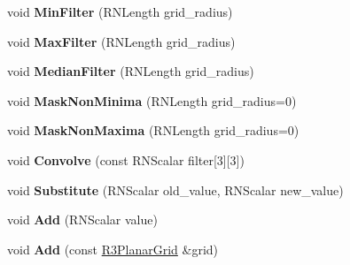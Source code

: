 \begin{DoxyCompactItemize}
\item 
void {\bfseries Min\+Filter} (R\+N\+Length grid\+\_\+radius)\hypertarget{class_r3_planar_grid_ae52410af81de7e0436f52debf78c15fe}{}\label{class_r3_planar_grid_ae52410af81de7e0436f52debf78c15fe}

\item 
void {\bfseries Max\+Filter} (R\+N\+Length grid\+\_\+radius)\hypertarget{class_r3_planar_grid_a4cea66aea6c435cc394eaa30842c377a}{}\label{class_r3_planar_grid_a4cea66aea6c435cc394eaa30842c377a}

\item 
void {\bfseries Median\+Filter} (R\+N\+Length grid\+\_\+radius)\hypertarget{class_r3_planar_grid_a0c0285eaea1580d210466c76c50890b2}{}\label{class_r3_planar_grid_a0c0285eaea1580d210466c76c50890b2}

\item 
void {\bfseries Mask\+Non\+Minima} (R\+N\+Length grid\+\_\+radius=0)\hypertarget{class_r3_planar_grid_a96004430a585c6b4657d3232fa7f50bb}{}\label{class_r3_planar_grid_a96004430a585c6b4657d3232fa7f50bb}

\item 
void {\bfseries Mask\+Non\+Maxima} (R\+N\+Length grid\+\_\+radius=0)\hypertarget{class_r3_planar_grid_a96b37e8de761174a9ed14cf457457b31}{}\label{class_r3_planar_grid_a96b37e8de761174a9ed14cf457457b31}

\item 
void {\bfseries Convolve} (const R\+N\+Scalar filter\mbox{[}3\mbox{]}\mbox{[}3\mbox{]})\hypertarget{class_r3_planar_grid_adde8a0aa7153250dc399e5f999f67808}{}\label{class_r3_planar_grid_adde8a0aa7153250dc399e5f999f67808}

\item 
void {\bfseries Substitute} (R\+N\+Scalar old\+\_\+value, R\+N\+Scalar new\+\_\+value)\hypertarget{class_r3_planar_grid_a4df52822bae9af496690a0146899332f}{}\label{class_r3_planar_grid_a4df52822bae9af496690a0146899332f}

\item 
void {\bfseries Add} (R\+N\+Scalar value)\hypertarget{class_r3_planar_grid_a0485235b93353d35afe358a39d364f74}{}\label{class_r3_planar_grid_a0485235b93353d35afe358a39d364f74}

\item 
void {\bfseries Add} (const \hyperlink{class_r3_planar_grid}{R3\+Planar\+Grid} \&grid)\hypertarget{class_r3_planar_grid_ad1e1bb238bea71e5bca04c09850a300f}{}\label{class_r3_planar_grid_ad1e1bb238bea71e5bca04c09850a300f}


\end{DoxyCompactItemize}
